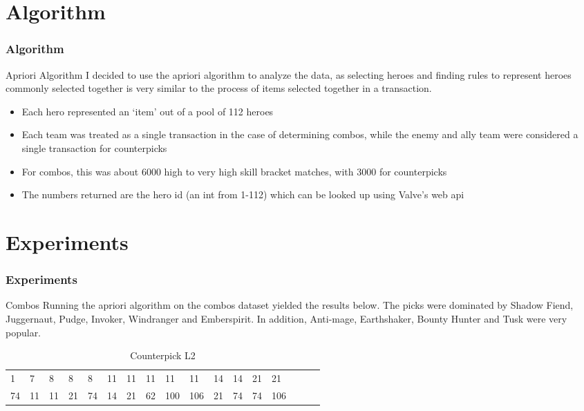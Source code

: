 \documentclass{beamer}
\begin{document}
\section{Algorithm}

\begin{frame}
\frametitle{Algorithm}
\begin{block}{Apriori Algorithm}
I decided to use the apriori algorithm to analyze the data, as selecting heroes and finding rules to represent heroes commonly selected together is very similar to the process of items selected together in a transaction. 
\begin{itemize}
	\item Each hero represented an `item' out of a pool of 112 heroes
	\item Each team was treated as a single transaction in the case of determining combos, while the enemy and ally team were considered a single transaction for counterpicks
	\item For combos, this was about 6000 high to very high skill bracket matches, with 3000 for counterpicks
	\item The numbers returned are the hero id (an int from 1-112) which can be looked up using Valve's web api
\end{itemize}
\end{block}

\end{frame}
\section{Experiments}

\begin{frame}
\frametitle{Experiments}
\begin{block}{Combos}
Running the apriori algorithm on the combos dataset yielded the results below. The picks were dominated by Shadow Fiend, Juggernaut, Pudge, Invoker, Windranger and Emberspirit. In addition, Anti-mage, Earthshaker, Bounty Hunter and Tusk were very popular. 
\end{block}
\begin{table}
\begin{tabular}{l l l l l l l l l l l l l l l l l}
\toprule
1 & 7 & 8 & 8 & 8 & 11 & 11 & 11 & 11 & 11 & 14 & 14 & 21 & 21\\
74 & 11 & 11 & 21 & 74 & 14 & 21 & 62 & 100 & 106 & 21 & 74 & 74 & 106 \\
\bottomrule
\end{tabular}
\caption{Counterpick L2}
\end{table}
\end{frame}
\end{document}
